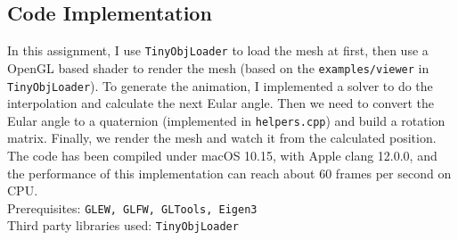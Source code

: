 \documentclass[acmtog]{acmart}
\begin{document}
\subsection{Code Implementation}
In this assignment, I use \texttt{TinyObjLoader} to load the mesh at first, then use a OpenGL based 
shader to render the mesh (based on the \texttt{examples/viewer} in \texttt{TinyObjLoader}). To generate 
the animation, I implemented a solver to do the interpolation and calculate the next Eular angle. Then 
we need to convert the Eular angle to a quaternion (implemented in \texttt{helpers.cpp}) and build a 
rotation matrix. Finally, we render the mesh and watch it from the calculated position.\\
The code has been compiled under macOS 10.15, with Apple clang 12.0.0, and the performance of this implementation 
can reach about 60 frames per second on CPU.\\
Prerequisites: \texttt{GLEW, GLFW, GLTools, Eigen3}\\
Third party libraries used: \texttt{TinyObjLoader}
\end{document}
